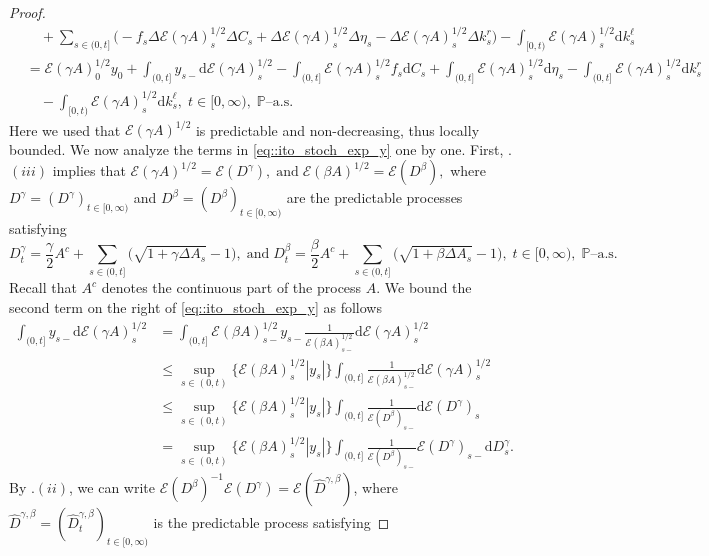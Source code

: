 \documentclass[10pt]{article} %
\newcommand\cE{\mathcal E}
\def \P{\mathbb{P}}
\newcommand{\1}{\mathbf{1}}
\def\d{\mathrm{d}}
\begin{document}
\begin{proof}
\begin{align}
		&\quad +\sum_{s \in (0,t]} \Big(-f_s\Delta \cE(\gamma A)^{1/2}_s \Delta C_s + \Delta \cE(\gamma A)^{1/2}_s \Delta \eta_s - \Delta \cE(\gamma A)^{1/2}_s \Delta k^r_s\Big) \nonumber - \int_{[0,t)} \cE(\gamma A)^{1/2}_s \d k^\ell_s \nonumber\\
		&= \cE(\gamma A)^{1/2}_0 y_0 + \int_{(0,t]}y_{s-}\d\cE(\gamma A)^{1/2}_s - \int_{(0,t]} \cE(\gamma A)^{1/2}_s f_s \d C_s + \int_{(0,t]} \cE(\gamma A)^{1/2}_s\d \eta_s - \int_{(0,t]} \cE(\gamma A)^{1/2}_s\d k^r_s \nonumber\\
		&\quad - \int_{[0,t)} \cE(\gamma A)^{1/2}_s \d k^\ell_s, \; t \in [0,\infty), \; \text{$\P$--a.s.} 
	\end{align}
	Here we used that $\cE(\gamma A)^{1/2}$ is predictable and non-decreasing, thus locally bounded. We now analyze the terms in \eqref{eq::ito_stoch_exp_y} one by one. First, .$(iii)$ implies that $\cE(\gamma A)^{1/2} = \cE(D^\gamma), \; \text{and} \; \cE(\beta A)^{1/2} = \cE(D^\beta),$ where $D^\gamma = (D^\gamma)_{t \in [0,\infty)}$ and $D^\beta = (D^\beta)_{t \in [0,\infty)}$ are the predictable processes satisfying
	\begin{equation*}
		D^\gamma_t = \frac{\gamma}{2} A^c + \sum_{s \in (0,t]} \big(\sqrt{1+\gamma\Delta A_s}-1\big), \; \text{and} \; D^\beta_t = \frac{\beta}{2} A^c + \sum_{s \in (0,t]} \big(\sqrt{1+\beta\Delta A_s}-1\big), \; t \in [0,\infty), \; \text{$\P$--a.s.}
	\end{equation*}
	Recall that $A^c$ denotes the continuous part of the process $A$. We bound the second term on the right of \eqref{eq::ito_stoch_exp_y} as follows
	\begin{align}\label{eq::sup_stoch_exp_inverse}
		\int_{(0,t]}y_{s-}\d\cE(\gamma A)^{1/2}_s 
		&= \int_{(0,t]}\cE(\beta A)^{1/2}_{s-}y_{s-}\frac{1}{\cE(\beta A)^{1/2}_{s-}}\d\cE(\gamma A)^{1/2}_s \nonumber\\
		&\leq \sup_{s \in (0,t)}\big\{\cE(\beta A)^{1/2}_{s}|y_{s}|\big\}\int_{(0,t]}\frac{1}{\cE(\beta A)^{1/2}_{s-}}\d\cE(\gamma A)^{1/2}_s \nonumber\\
		&\leq \sup_{s \in (0,t)}\big\{\cE(\beta A)^{1/2}_{s}|y_{s}|\big\}\int_{(0,t]}\frac{1}{\cE(D^\beta)_{s-}}\d\cE(D^\gamma)_s \nonumber\\
		&= \sup_{s \in (0,t)}\big\{\cE(\beta A)^{1/2}_{s}|y_{s}|\big\}\int_{(0,t]}\frac{1}{\cE(D^\beta)_{s-}}\cE(D^\gamma)_{s-}\d D^\gamma_s.
	\end{align}
	By .$(ii)$, we can write $\cE(D^\beta)^{-1}\cE(D^\gamma) = \cE(\widehat D^{\gamma,\beta})$, where $\widehat D^{\gamma,\beta} = (\widehat D^{\gamma,\beta}_t)_{t \in [0,\infty)}$ is the predictable process satisfying

\end{proof}
\end{document}
